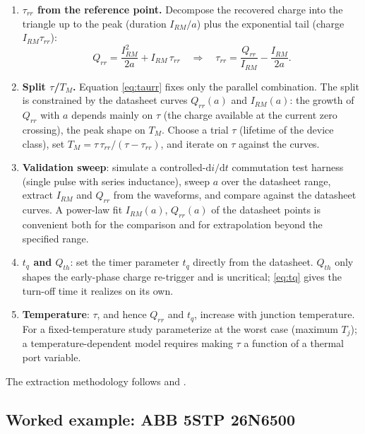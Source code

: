 \documentclass[11pt,a4paper]{article}
\begin{document}
\begin{enumerate}
  \item \textbf{$\tau_{rr}$ from the reference point.} Decompose the
        recovered charge into the triangle up to the peak (duration
        $I_{RM}/a$) plus the exponential tail (charge $I_{RM}\tau_{rr}$):
        \begin{equation}
          Q_{rr} = \frac{I_{RM}^2}{2a} + I_{RM}\,\tau_{rr}
          \quad\Longrightarrow\quad
          \tau_{rr} = \frac{Q_{rr}}{I_{RM}} - \frac{I_{RM}}{2a}.
          \label{eq:taurr}
        \end{equation}
  \item \textbf{Split $\tau$/$T_M$.} Equation \eqref{eq:taurr} fixes only
        the parallel combination. The split is constrained by the datasheet
        curves $Q_{rr}(a)$ and $I_{RM}(a)$: the growth of $Q_{rr}$ with $a$
        depends mainly on $\tau$ (the charge available at the current zero
        crossing), the peak shape on $T_M$. Choose a trial $\tau$
        (lifetime of the device class), set
        $T_M = \tau\,\tau_{rr}/(\tau - \tau_{rr})$, and iterate on $\tau$
        against the curves.
  \item \textbf{Validation sweep}: simulate a controlled-$\mathrm{d}i/\mathrm{d}t$
        commutation test harness (single pulse with series inductance),
        sweep $a$ over the datasheet range, extract $I_{RM}$ and
        $Q_{rr}$ from the waveforms, and compare against the datasheet curves.
        A power-law fit $I_{RM}(a)$, $Q_{rr}(a)$ of the datasheet points is
        convenient both for the comparison and for extrapolation beyond the
        specified range.
  \item \textbf{$t_q$ and $Q_{th}$}: set the timer parameter $t_q$ directly
        from the datasheet. $Q_{th}$ only shapes the early-phase charge
        re-trigger and is uncritical; \eqref{eq:tq} gives the turn-off time
        it realizes on its own.
  \item \textbf{Temperature}: $\tau$, and hence $Q_{rr}$ and $t_q$, increase
        with junction temperature. For a fixed-temperature study parameterize
        at the worst case (maximum $T_j$); a temperature-dependent model
        requires making $\tau$ a function of a thermal port variable.
\end{enumerate}

The extraction methodology follows \cite{ma1997} and \cite{courtay1995}.

\subsection{Worked example: ABB 5STP 26N6500}
\end{document}
